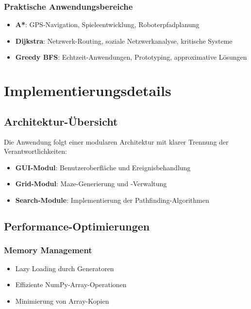 \documentclass[12pt,a4paper]{article}
\begin{document}
\subsubsection{Praktische Anwendungsbereiche}

\begin{itemize}
    \item \textbf{A*}: GPS-Navigation, Spieleentwicklung, Roboterpfadplanung
    \item \textbf{Dijkstra}: Netzwerk-Routing, soziale Netzwerkanalyse, kritische Systeme
    \item \textbf{Greedy BFS}: Echtzeit-Anwendungen, Prototyping, approximative Lösungen
\end{itemize}

\section{Implementierungsdetails}

\subsection{Architektur-Übersicht}

Die Anwendung folgt einer modularen Architektur mit klarer Trennung der Verantwortlichkeiten:

\begin{itemize}
    \item \textbf{GUI-Modul}: Benutzeroberfläche und Ereignisbehandlung
    \item \textbf{Grid-Modul}: Maze-Generierung und -Verwaltung
    \item \textbf{Search-Module}: Implementierung der Pathfinding-Algorithmen
\end{itemize}

\subsection{Performance-Optimierungen}

\subsubsection{Memory Management}
\begin{itemize}
    \item Lazy Loading durch Generatoren
    \item Effiziente NumPy-Array-Operationen
    \item Minimierung von Array-Kopien
\end{itemize}
\end{document}
